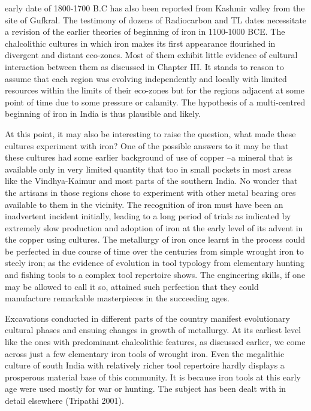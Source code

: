 early date of 1800-1700 B.C has also been reported from Kashmir valley from the site of Gufkral. The testimony of dozens of Radiocarbon and TL dates necessitate a revision of the earlier theories of beginning of iron in 1100-1000 BCE.  The chalcolithic cultures in which iron makes its first appearance flourished in divergent and distant eco-zones. Most of them exhibit little evidence of cultural interaction between them as discussed in Chapter III. It stands to reason to assume that each region was evolving independently and locally with limited resources within the limits of their eco-zones but for the regions adjacent at some point of time due to some pressure or calamity. The hypothesis of a multi-centred beginning of iron in India is thus plausible and likely.  

At this point, it may also be interesting to raise the question, what made these cultures experiment with iron? One of the possible answers to it may be that these cultures had some earlier background of use of copper –a mineral that is available only in very limited quantity that too in small pockets in most areas like the Vindhya-Kaimur and most parts of the southern India. No wonder that the artisans in those regions chose to experiment with other metal bearing ores available to them in the vicinity. The recognition of iron must have been an inadvertent incident initially, leading to a long period of trials as indicated by extremely slow production and adoption of iron at the early level of its advent in the copper using cultures. The metallurgy of iron once learnt in the process could be perfected in due course of time over the centuries from simple wrought iron to steely iron; as the evidence of evolution in tool typology from elementary hunting and fishing tools to a complex tool repertoire shows. The engineering skills, if one may be allowed to call it so, attained such perfection that they could manufacture remarkable masterpieces in the succeeding ages. 

Excavations conducted in different parts of the country manifest evolutionary cultural phases and ensuing changes in growth of metallurgy. At its earliest level like the ones with predominant chalcolithic features, as discussed earlier, we come across just a few elementary iron tools of wrought iron. Even the megalithic culture of south India with relatively richer tool repertoire hardly displays a prosperous material base of this community. It is because iron tools at this early age were used mostly for war or hunting. The subject has been dealt with in detail elsewhere (Tripathi 2001).

